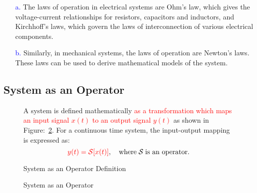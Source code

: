 \documentclass[../notes-main.tex]{subfiles}
\begin{document}
\begin{itemize}
    \item[\textcolor{blue}{a.}] The laws of operation in electrical systems are Ohm's law, which gives the voltage-current relationships for resistors, capacitors and inductors, and Kirchhoff's laws, which govern the laws of interconnection of various electrical components.
    \item[\textcolor{blue}{b.}] Similarly, in mechanical systems, the laws of operation are Newton's laws. These laws can be used to derive mathematical models of the system.
\end{itemize}
\subsection{System as an Operator}
\begin{figure}[H]
    \centering
    \begin{mdframed}
        \begin{center}
            A system is defined mathematically \textcolor{red}{as a transformation which maps an input signal \(x(t)\) to an output signal \(y(t)\)} as shown in Figure:~\ref{fig:system-operator-def-2}. For a continuous time system, the input-output mapping is expressed as:
            \begin{equation}
                \textcolor{red}{y(t) = \mathcal{S}[x(t)]}, \quad \text{where} \; \mathcal{S} \; \text{is an operator.}
                \label{eq:system-operator-def-1}
            \end{equation}
        \end{center}
    \end{mdframed}\label{fig:system-operator-def-1}
    \vspace{-1em}\caption{System as an Operator Definition}
\end{figure}
\vspace{-1em}
\begin{figure}[H]
    \centering
    \begin{mdframed}
        \begin{center}
        \end{center}
    \end{mdframed}
    \vspace{-1em}\caption{System as an Operator}\label{fig:system-operator-def-2}
\end{figure}
\end{document}
